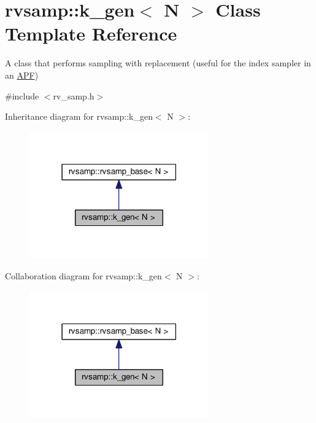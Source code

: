 \hypertarget{classrvsamp_1_1k__gen}{}\section{rvsamp\+:\+:k\+\_\+gen$<$ N $>$ Class Template Reference}
\label{classrvsamp_1_1k__gen}


A class that performs sampling with replacement (useful for the index sampler in an \hyperlink{classAPF}{A\+PF})  




{\ttfamily \#include $<$rv\+\_\+samp.\+h$>$}



Inheritance diagram for rvsamp\+:\+:k\+\_\+gen$<$ N $>$\+:\nopagebreak
\begin{figure}[H]
\begin{center}
\leavevmode
\includegraphics[width=219pt]{classrvsamp_1_1k__gen__inherit__graph}
\end{center}
\end{figure}


Collaboration diagram for rvsamp\+:\+:k\+\_\+gen$<$ N $>$\+:\nopagebreak
\begin{figure}[H]
\begin{center}
\leavevmode
\includegraphics[width=219pt]{classrvsamp_1_1k__gen__coll__graph}
\end{center}
\end{figure}
